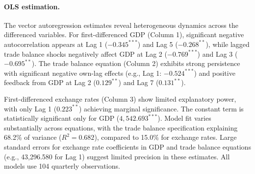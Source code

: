 \documentclass[
]{article}
\begin{document}
	\paragraph*{OLS estimation.} 
	
	
	The vector autoregression estimates reveal heterogeneous dynamics across the
	differenced variables. For first-differenced GDP (Column 1), significant 
	negative autocorrelation appears at Lag 1 ($-0.345^{***}$) and 
	Lag 5 ($-0.268^{**}$), while lagged trade balance shocks negatively
	affect GDP at Lag 2 ($-0.769^{***}$) and Lag 3 ($-0.695^{**}$). 
	The trade balance equation (Column 2) exhibits strong persistence with 
	significant negative own-lag effects (e.g., Lag 1: $-0.524^{***}$)
	and positive feedback from GDP at Lag 2 ($0.129^{**}$) and Lag 7 ($0.131^{**}$). 
	
	First-differenced exchange rates (Column 3) show limited explanatory power, 
	with only Lag 1 ($0.223^{**}$) achieving marginal significance. 
	The constant term is statistically significant only for GDP ($4,\!542.693^{***}$). 
	Model fit varies substantially across equations, with the trade balance 
	specification explaining 68.2\% of variance ($R^2 = 0.682$), compared to 
	15.0\% for exchange rates. Large standard errors for exchange rate coefficients 
	in GDP and trade balance equations (e.g., 43,296.580 for Lag 1) suggest
	limited precision in these estimates. All models use 104 quarterly observations.
	
\end{document}
